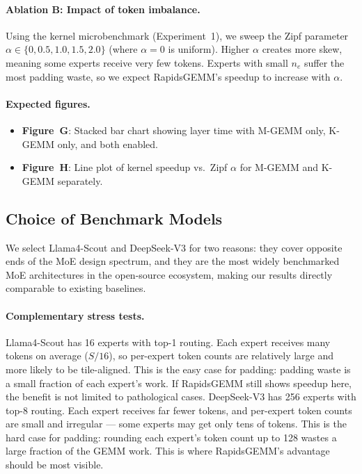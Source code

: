 \documentclass[11pt,a4paper]{article}
\theoremstyle{definition}
\begin{document}
\paragraph{Ablation B: Impact of token imbalance.}
Using the kernel microbenchmark (Experiment~1), we sweep the Zipf
parameter $\alpha \in \{0, 0.5, 1.0, 1.5, 2.0\}$ (where
$\alpha = 0$ is uniform).
Higher $\alpha$ creates more skew, meaning some experts receive
very few tokens.
Experts with small $n_e$ suffer the most padding waste, so we expect
RapidsGEMM's speedup to increase with $\alpha$.

\paragraph{Expected figures.}
\begin{itemize}
  \item \textbf{Figure~G}: Stacked bar chart showing layer time
    with M-GEMM only, K-GEMM only, and both enabled.
  \item \textbf{Figure~H}: Line plot of kernel speedup vs.\ Zipf
    $\alpha$ for M-GEMM and K-GEMM separately.
\end{itemize}

\subsection{Choice of Benchmark Models}
\label{sec:exp-model-choice}

We select Llama4-Scout and DeepSeek-V3 for two reasons:
they cover opposite ends of the MoE design spectrum, and they are
the most widely benchmarked MoE architectures in the open-source
ecosystem, making our results directly comparable to existing
baselines.

\paragraph{Complementary stress tests.}
Llama4-Scout has 16 experts with top-1 routing.
Each expert receives many tokens on average ($S / 16$), so
per-expert token counts are relatively large and more likely to be
tile-aligned.
This is the easy case for padding: padding waste is a small fraction
of each expert's work.
If RapidsGEMM still shows speedup here, the benefit is not limited
to pathological cases.
DeepSeek-V3 has 256 experts with top-8 routing.
Each expert receives far fewer tokens, and per-expert token counts
are small and irregular --- some experts may get only tens of tokens.
This is the hard case for padding: rounding each expert's token
count up to 128 wastes a large fraction of the GEMM work.
This is where RapidsGEMM's advantage should be most visible.
\end{document}
